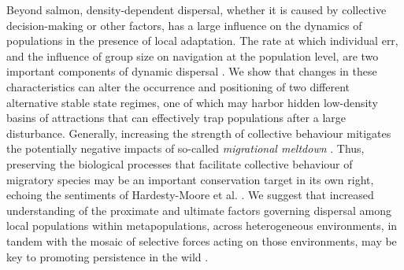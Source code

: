 \documentclass{revtex4}
\begin{document}
Beyond salmon, density-dependent dispersal, whether it is caused by collective decision-making or other factors, has a large influence on the dynamics of populations in the presence of local adaptation.
The rate at which individual err, and the influence of group size on navigation at the population level, are two important components of dynamic dispersal \citep{Berdahl:2016dx}.
We show that changes in these characteristics can alter the occurrence and positioning of two different alternative stable state regimes, one of which may harbor hidden low-density basins of attractions that can effectively trap populations after a large disturbance.
Generally, increasing the strength of collective behaviour mitigates the potentially negative impacts of so-called \emph{migrational meltdown} \citep{Ronce:2001dp}.
Thus, preserving the biological processes that facilitate collective behaviour of migratory species may be an important conservation target in its own right, echoing the sentiments of Hardesty-Moore et al. \citep{HardestyMoore:wg}. 
We suggest that increased understanding of the proximate and ultimate factors governing dispersal among local populations within metapopulations, across heterogeneous environments, in tandem with the mosaic of selective forces acting on those environments, may be key to promoting persistence in the wild \cite{Westley:uh}.
\\ \\
\end{document}
